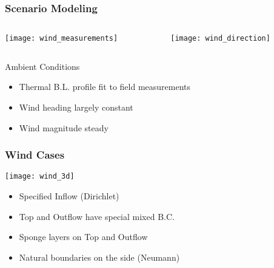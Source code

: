 \documentclass[mathserif]{beamer}
\begin{document}
%
%
%
\begin{frame}
\frametitle{Scenario Modeling}
 
 \begin{columns}[]
  \begin{column}{0.5\linewidth}

   \begin{center}
    \texttt{[image: wind\_measurements]}
   \end{center}

  \end{column}
  \begin{column}{0.5\linewidth}
 
   \begin{center}
    \texttt{[image: wind\_direction]}
   \end{center}
  
  \end{column}
\end{columns}


  \begin{block}{Ambient Conditions}
  \begin{itemize}
  \item	Thermal B.L. profile fit to field measurements
  \item Wind heading largely constant 
  \item Wind magnitude steady 
  \end{itemize}
  \end{block}	

\end{frame}


%
%
%
\begin{frame}
\frametitle{Wind Cases}

\begin{block}

   \begin{center}
    \texttt{[image: wind\_3d]}
   \end{center}

   \begin{itemize}
   \item Specified Inflow (Dirichlet)
   \item Top and Outflow have special mixed B.C.
   \item Sponge layers on Top and Outflow
   \item Natural boundaries on the side (Neumann)
   \end{itemize}

\end{block}
\end{frame}
\end{document}
